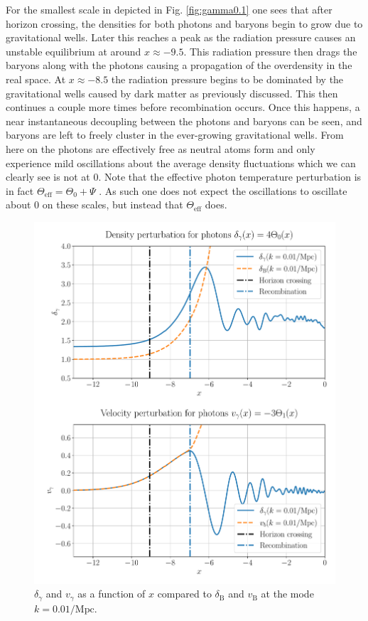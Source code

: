 \documentclass[%
reprint,
 amsmath,amssymb,
 aps,
]{revtex4-2}
\begin{document}
For the smallest scale in depicted in Fig. \ref{fig:gamma0.1} one sees that after horizon crossing, the densities for both photons and baryons begin to grow due to gravitational wells. Later this reaches a peak as the radiation pressure causes an unstable equilibrium at around $x\approx-9.5$. This radiation pressure then drags the baryons along with the photons causing a propagation of the overdensity in the real space. At $x\approx-8.5$ the radiation pressure begins to be dominated by the gravitational wells caused by dark matter as previously discussed. This then continues a couple more times before recombination occurs. Once this happens, a near instantaneous decoupling between the photons and baryons can be seen, and baryons are left to freely cluster in the ever-growing gravitational wells. From here on the photons are effectively free as neutral atoms form and only experience mild oscillations about the average density fluctuations which we can clearly see is not at 0. Note that the effective photon temperature perturbation is in fact $\Theta_\text{eff}=\Theta_0+\Psi$ \cite{AST5220LectureNotes}. As such one does not expect the oscillations to oscillate about $0$ on these scales, but instead that $\Theta_\text{eff}$ does.
\begin{figure}[ht!]
	\includegraphics[width = \linewidth]{Figures/gamma0.01.pdf}
	\caption{$\delta_\gamma$ and $v_\gamma$ as a function of $x$ compared to $\delta_\text{B}$ and $v_\text{B}$ at the mode $k=0.01/\text{Mpc}$.}
	\label{fig:gamma0.01}
\end{figure}
\end{document}
